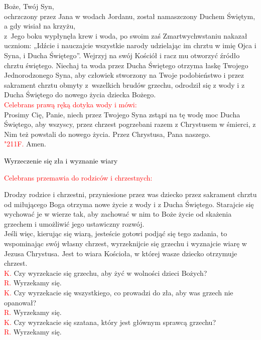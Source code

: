 \documentclass[11pt, a5paper]{extarticle}
\newcommand{\textjuni}[1]{{\fontspec{Junicode}#1}}
\newcommand{\response}{\textcolor{red}{\textjuni{\char"211F. }}}
\begin{document}
\begin{Parallel}[v]{0.485\textwidth}{0.485\textwidth}
{Boże, Twój Syn, \\ ochrzczony
przez Jana w wodach Jordanu,
został namaszczony Duchem Świętym,
a gdy wisiał na krzyżu,\\ z~Jego boku wypłynęła krew i woda,
po swoim zaś Zmartwychwstaniu nakazał uczniom:
„Idźcie i nauczajcie wszystkie narody
udzielając im chrztu w imię Ojca i Syna, i Ducha Świętego”.
Wejrzyj na swój Kościół
i racz mu otworzyć źródło chrztu świętego.
Niechaj ta woda przez Ducha Świętego otrzyma łaskę
Twojego Jednorodzonego Syna,
aby człowiek stworzony na Twoje podobieństwo
i przez sakrament chrztu obmyty z~wszelkich brudów grzechu,
odrodził się z wody i z Ducha Świętego
do nowego życia dziecka Bożego. \\
\textcolor{red}{Celebrans prawą ręką dotyka wody i mówi:} \\
Prosimy Cię, Panie, niech przez Twojego Syna
zstąpi na tę wodę moc Ducha Świętego,
aby wszyscy, przez chrzest pogrzebani
razem z Chrystusem w śmierci,
z Nim też powstali do nowego życia.
Przez Chrystusa, Pana naszego. \\
\response Amen. \\
}
\end{Parallel}


\begin{center}
\Large
\noindent\textcolor{black}{Wyrzeczenie się zła i wyznanie wiary}
\end{center}

\textcolor{red}{Celebrans przemawia do rodziców i chrzestnych:}

Drodzy rodzice i chrzestni, przyniesione przez was dziecko przez sakrament chrztu od miłującego Boga otrzyma nowe życie z wody i z Ducha Świętego. Starajcie się wychować je w wierze tak, aby zachować w nim to Boże życie od skażenia grzechem i umożliwić jego ustawiczny rozwój. \\
Jeśli więc, kierując się wiarą, jesteście gotowi podjąć się tego zadania, to wspominając swój własny chrzest, wyrzeknijcie się grzechu i wyznajcie wiarę w Jezusa Chrystusa. Jest to wiara Kościoła, w której wasze dziecko otrzymuje chrzest.\\
\textcolor{red}{K.} Czy wyrzekacie się grzechu, aby żyć w wolności dzieci Bożych?  \\
\textcolor{red}{R.} Wyrzekamy się. \\
\textcolor{red}{K.} Czy wyrzekacie się wszystkiego, co prowadzi do zła, aby was grzech nie opanował?  \\
\textcolor{red}{R.} Wyrzekamy się. \\
\textcolor{red}{K.} Czy wyrzekacie się szatana, który jest głównym sprawcą grzechu?  \\
\textcolor{red}{R.} Wyrzekamy się. \\
\end{document}
